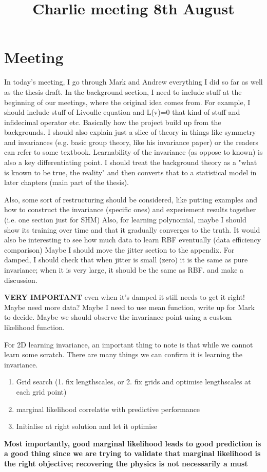 \documentclass{article}
\title{\vspace{-3cm}Charlie meeting 8th August\vspace{-3em}}
\author{}
\date{}
\begin{document}
\maketitle
\section*{Meeting}
In today's meeting, I go through Mark and Andrew everything I did so far as well as the thesis draft.
In the background section, I need to include stuff at the beginning of our meetings, where the original idea comes from. For example, I should include stuff of Livoulle equation and L(v)=0 that kind of stuff and infidecimal operator etc.
Basically how the project build up from the backgrounds. 
I should also explain just a slice of theory in things like symmetry and invariances (e.g. basic group theory, like his invariance paper) or the readers can refer to some textbook.
Learnability of the invariance (as oppose to known) is also a key differentiating point.
I should treat the background theory as a "what is known to be true, the reality" and then converts that to a statistical model in later chapters (main part of the thesis).

Also, some sort of restructuring should be considered, like putting examples and how to construct the invariance (specific ones) and experiement results together (i.e. one section just for SHM)
Also, for learning polynomial, maybe I should show its training over time and that it gradually converges to the truth.
It would also be interesting to see how much data to learn RBF eventually (data efficiency comparison)
Maybe I should move the jitter section to the appendix.
For damped, I should check that when jitter is small (zero) it is the same as pure invariance; when it is very large, it should be the same as RBF. and make a discussion.

\textbf{VERY IMPORTANT}
even when it's damped it still needs to get it right! Maybe need more data?
Maybe I need to use mean function, write up for Mark to decide. Maybe we should observe the invariance point using a custom likelihood function.

For 2D learning invariance, an important thing to note is that while we cannot learn some scratch. 
There are many things we can confirm it is learning the invariance.
\begin{enumerate}
  \item Grid search (1. fix lengthscales, or 2. fix grids and optimise lengthscales at each grid point)
  \item marginal likelihood correlatte with predictive performance
  \item Initialise at right solution and let it optimise
\end{enumerate}
\textbf{Most importantly, good marginal likelihood leads to good prediction is a good thing since we are trying to validate that marginal likelihood is the right objective; recovering the physics is not necessarily a must}
\end{document}
